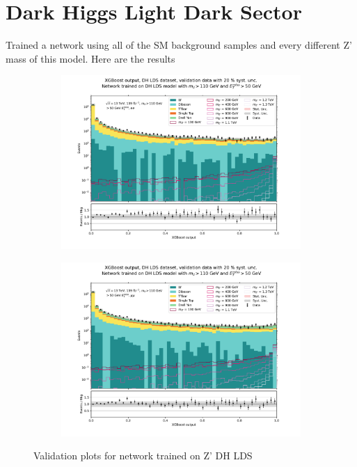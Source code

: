 \documentclass[12pt, a4paper]{book}
\begin{document}
\clearpage
\section{Dark Higgs Light Dark Sector}
Trained a network using all of the SM background samples and every different Z' mass of this model. Here are the results
\begin{figure}[!ht]
	\centering
	\begin{subfigure}[b]{0.49\textwidth}
      \centering
      \includegraphics[width=1\textwidth]{XGBoost/DH_LDS/VAL_ee.pdf}
      \end{subfigure}
   \hfill
   \begin{subfigure}[b]{0.49\textwidth}
      \centering
      \includegraphics[width=1\textwidth]{XGBoost/DH_LDS/VAL_uu.pdf}
      \end{subfigure}
   \caption{Validation plots for network trained on Z' DH LDS}\label{fig:DH_LDS_vals}
\end{figure}
\end{document}
